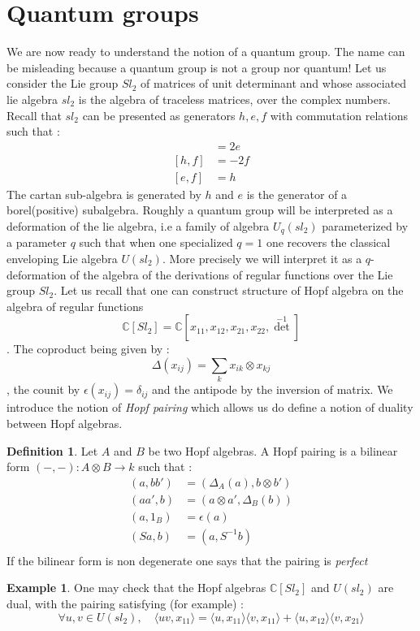 \documentclass[11pt]{article}
\theoremstyle{definition}
\newtheorem{ex}{Example}[section]
\newtheorem{Def}{Definition}[section]
\begin{document}
\section{\Large \textbf{Quantum groups}}
We are now ready to understand the notion of a quantum group. The name can be misleading because a quantum group is not a group nor quantum! Let us consider the Lie group $Sl_2$ of matrices of unit determinant and whose associated lie algebra $sl_2$ is the algebra of traceless matrices, over the complex numbers. Recall that $sl_2$ can be presented as generators $h,e,f$ with commutation relations such that : \begin{align*}
[h,e]&=2e\\
[h,f]&=-2f\\
[e,f]&=h
\end{align*}
The cartan sub-algebra is generated by $h$ and $e$ is the generator of a borel(positive) subalgebra. Roughly a quantum group will be interpreted as a deformation of the lie algebra, i.e a family of algebra $U_q(sl_2)$ parameterized by a parameter $q$ such that when one specialized $q=1$ one recovers the classical enveloping  Lie algebra $U(sl_2)$. More precisely we will interpret it as a $q$-deformation of the algebra of the  derivations of regular functions over the Lie group $Sl_2$. Let us recall that one can construct structure of Hopf algebra on the algebra of regular functions $$\mathbb{C}[Sl_2]=\mathbb{C}[x_{11},x_{12},x_{21},x_{22},\det^{-1}]$$. The coproduct  being given by : $$\Delta(x_{ij})=\sum_k x_{ik}\otimes x_{kj} $$, the counit by $\epsilon(x_{ij})=\delta_{ij}$ and the antipode by the inversion of matrix. We introduce the notion of \textit{Hopf pairing} which allows us do define a notion of duality between Hopf algebras.\begin{Def}
Let $A$ and $B$ be two Hopf algebras. A Hopf pairing is a bilinear form $(-,-) : A\otimes B\to k$ such that : \begin{align*}
(a,bb')&=(\Delta_A(a),b\otimes b')\\
(aa',b)&=(a\otimes a',\Delta_B(b))\\
(a,1_B)&=\epsilon(a)\\
(Sa,b)&=(a,S^{-1}b)\\
\end{align*}
If the bilinear form is non degenerate one says that the pairing is \textit{perfect}
\begin{ex}\label{classical duality} One may check that the Hopf algebras $\mathbb{C}[Sl_2]$ and $U(sl_2)$ are dual, with the pairing satisfying (for example) : $$\forall u,v\in U(sl_2),\quad \langle uv,x_{11}\rangle = \langle u,x_{11}\rangle\langle v,x_{11}\rangle+\langle u,x_{12}\rangle\langle v,x_{21}\rangle$$
\end{ex}
\end{Def}
\end{document}
